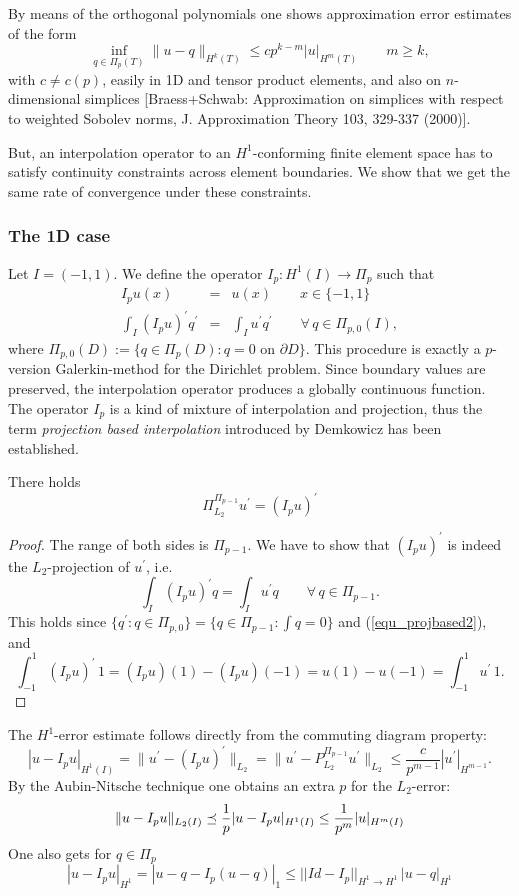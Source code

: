 By means of the orthogonal polynomials one shows approximation error estimates
of the form
$$
\inf_{q \in \Pi_p(T)} \| u - q \|_{H^k(T)} \leq c p^{k-m} | u |_{H^m(T)} \qquad m \geq k,
$$
with $c \neq c(p)$, easily in 1D and tensor product elements, and also on $n$-dimensional simplices [Braess+Schwab: Approximation on simplices with respect to weighted Sobolev norms, J. Approximation Theory 103, 329-337 (2000)].
 
But, an interpolation operator to an $H^1$-conforming finite element space has to satisfy continuity constraints across element boundaries. We show that we get the same rate of convergence under these constraints.

\subsubsection{The 1D case}
Let $I=(-1,1)$. We define the operator $I_p : H^1(I) \rightarrow \Pi_p$ such that
\begin{eqnarray}
I_p u(x) & = & u(x) \qquad x \in \{ -1, 1 \}   \label{equ_projbased1} \\
\int_I (I_p u)^\prime q^\prime & = &  \int_I u^\prime q^\prime \qquad \forall \, q \in \Pi_{p,0}(I),   \label{equ_projbased2} 
\end{eqnarray}
where $\Pi_{p,0}(D) := \{ q \in \Pi_p(D) : q = 0 \text{ on } \partial D\}$.
This procedure is exactly a $p$-version Galerkin-method for the
Dirichlet problem.  Since boundary values are preserved, the
interpolation operator produces a globally continuous function.  The
operator $I_p$ is a kind of mixture of interpolation and projection,
thus the term {\em projection based interpolation} introduced by
Demkowicz has been established.

\begin{lemma} There holds
$$
\Pi_{L_2}^{\Pi_{p-1}} u^\prime = (I_p u)^\prime 
$$
\end{lemma}
\begin{proof} The range of both sides is $\Pi_{p-1}$. We have to show that 
$(I_p u)^\prime$ is indeed the $L_2$-projection of $u^\prime$, i.e.
$$ 
\int_I (I_p u)^\prime q = \int_I u^\prime q \qquad \forall \, q \in \Pi_{p-1}.
$$
This holds since $\{ q^\prime : q \in \Pi_{p,0} \} = \{ q \in \Pi_{p-1} : \int q = 0 \}$ and (\ref{equ_projbased2}), and 
$$
\int_{-1}^1 (I_p u)^\prime \, 1 = (I_p u)(1)  - (I_p u)(-1) = u(1) - u(-1) = \int_{-1}^1 u^\prime \, 1.
$$
\end{proof}

The $H^1$-error estimate follows directly from the commuting diagram property:
$$
| u - I_p u |_{H^1(I)} = \| u^\prime - (I_p u)^\prime \|_{L_2} = 
\| u^\prime - P_{L_2}^{\Pi_{p-1}} u^\prime \|_{L_2} \leq \frac{c}{p^{m-1}} | u^\prime |_{H^{m-1}}.
$$
By the Aubin-Nitsche technique one obtains an extra $p$ for the $L_2$-error:
$$
\| u - I_p u \|_{L_2(I)} \preceq \frac{1}{p} | u - I_p u |_{H^1(I)} \leq \frac{1}{p^m} | u |_{H^m(I)}
$$
One also gets for $q \in \Pi_p$
$$
| u - I_p u |_{H^1} = | u-q - I_p (u-q) |_1 \leq || Id - I_p ||_{H^1\rightarrow H^1} \, | u - q |_{H^1}
$$

